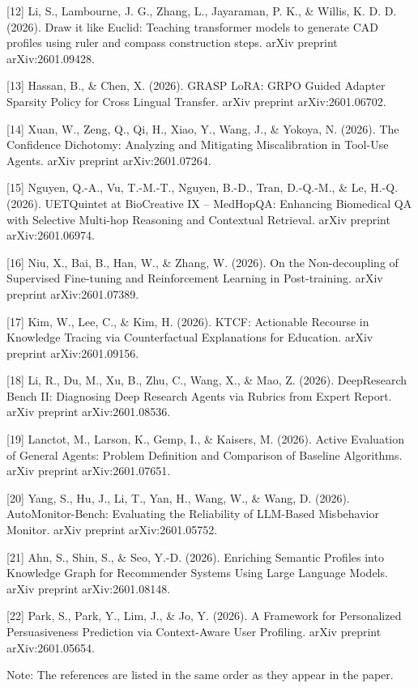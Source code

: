 [12] Li, S., Lambourne, J. G., Zhang, L., Jayaraman, P. K., & Willis, K. D. D. (2026). Draw it like Euclid: Teaching transformer models to generate CAD profiles using ruler and compass construction steps. arXiv preprint arXiv:2601.09428.

[13] Hassan, B., & Chen, X. (2026). GRASP LoRA: GRPO Guided Adapter Sparsity Policy for Cross Lingual Transfer. arXiv preprint arXiv:2601.06702.

[14] Xuan, W., Zeng, Q., Qi, H., Xiao, Y., Wang, J., & Yokoya, N. (2026). The Confidence Dichotomy: Analyzing and Mitigating Miscalibration in Tool-Use Agents. arXiv preprint arXiv:2601.07264.

[15] Nguyen, Q.-A., Vu, T.-M.-T., Nguyen, B.-D., Tran, D.-Q.-M., & Le, H.-Q. (2026). UETQuintet at BioCreative IX -- MedHopQA: Enhancing Biomedical QA with Selective Multi-hop Reasoning and Contextual Retrieval. arXiv preprint arXiv:2601.06974.

[16] Niu, X., Bai, B., Han, W., & Zhang, W. (2026). On the Non-decoupling of Supervised Fine-tuning and Reinforcement Learning in Post-training. arXiv preprint arXiv:2601.07389.

[17] Kim, W., Lee, C., & Kim, H. (2026). KTCF: Actionable Recourse in Knowledge Tracing via Counterfactual Explanations for Education. arXiv preprint arXiv:2601.09156.

[18] Li, R., Du, M., Xu, B., Zhu, C., Wang, X., & Mao, Z. (2026). DeepResearch Bench II: Diagnosing Deep Research Agents via Rubrics from Expert Report. arXiv preprint arXiv:2601.08536.

[19] Lanctot, M., Larson, K., Gemp, I., & Kaisers, M. (2026). Active Evaluation of General Agents: Problem Definition and Comparison of Baseline Algorithms. arXiv preprint arXiv:2601.07651.

[20] Yang, S., Hu, J., Li, T., Yan, H., Wang, W., & Wang, D. (2026). AutoMonitor-Bench: Evaluating the Reliability of LLM-Based Misbehavior Monitor. arXiv preprint arXiv:2601.05752.

[21] Ahn, S., Shin, S., & Seo, Y.-D. (2026). Enriching Semantic Profiles into Knowledge Graph for Recommender Systems Using Large Language Models. arXiv preprint arXiv:2601.08148.

[22] Park, S., Park, Y., Lim, J., & Jo, Y. (2026). A Framework for Personalized Persuasiveness Prediction via Context-Aware User Profiling. arXiv preprint arXiv:2601.05654.

Note: The references are listed in the same order as they appear in the paper. 

